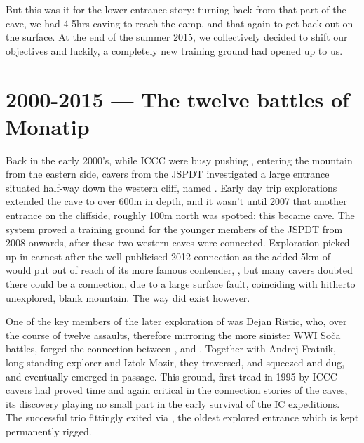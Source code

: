 But this was it for the lower entrance story: turning back from that part of the cave, we had 4-5hrs caving to reach the camp, and that again to get back out on the surface. At the end of the summer 2015, we collectively decided to shift our objectives and luckily, a completely new training ground had opened up to us.

\section{2000-2015 --- The twelve battles of Monatip}
\label{sec:early primadona}
Back in the early 2000's, while ICCC were busy pushing , entering the mountain from the eastern side, cavers from the JSPDT investigated a large entrance situated half-way down the western cliff, named . Early day trip explorations extended the cave to over 600m in depth, and it wasn't until 2007 that another entrance  on the cliffside, roughly 100m north was spotted: this became  cave. The system proved a training ground for the younger members of the JSPDT from 2008 onwards, after these two western caves were connected. Exploration picked up in earnest after the well publicised 2012 connection as the added 5km of -- would put  out of reach of its more famous contender, , but many cavers doubted there could be a connection, due to a large surface fault, coinciding with hitherto unexplored, blank mountain. The way did exist however.

One of the key members of the later exploration of  was Dejan Ristic, who, over the course of twelve assaults, therefore mirroring the more sinister WWI Soča battles, forged the connection between , and . Together with Andrej Fratnik, long-standing  explorer and Iztok Mozir, they traversed, and squeezed and dug, and eventually emerged in  passage. This ground, first tread in 1995 by ICCC cavers had proved time and again critical in the connection stories of the  caves, its discovery playing no small part in the early survival of the IC expeditions. The successful trio fittingly exited via , the oldest explored entrance which is kept permanently rigged.

